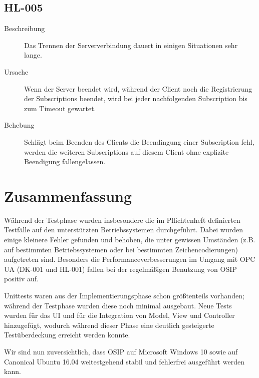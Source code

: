 \documentclass[parskip=full]{scrartcl}
\begin{document}
\subsection{HL-005}
\begin{description}
	\item[Beschreibung] Das Trennen der Serververbindung dauert in einigen Situationen sehr lange.
	\item[Ursache] Wenn der Server beendet wird, während der Client noch die Registrierung der Subscriptions beendet, wird bei jeder nachfolgenden Subscription bis zum Timeout gewartet.
	\item[Behebung] Schlägt beim Beenden des Clients die Beendingung einer Subscription fehl, werden die weiteren Subscriptions auf diesem Client ohne explizite Beendigung fallengelassen.
\end{description}

\section{Zusammenfassung}
Während der Testphase wurden insbesondere die im Pflichtenheft definierten Testfälle auf den unterstützten Betriebssystemen durchgeführt.
Dabei wurden einige kleinere Fehler gefunden und behoben, die unter gewissen Umständen (z.B. auf bestimmten Betriebssystemen oder bei bestimmten Zeichencodierungen)
aufgetreten sind. Besonders die Performanceverbesserungen im Umgang mit OPC UA (DK-001 und HL-001) fallen bei der regelmäßigen Benutzung von OSIP positiv auf.

Unittests waren aus der Implementierungsphase schon größtenteils vorhanden; während der Testphase wurden diese noch minimal ausgebaut. Neue Tests wurden für das UI
und für die Integration von Model, View und Controller hinzugefügt, wodurch während dieser Phase eine deutlich gesteigerte Testüberdeckung erreicht werden konnte.

Wir sind nun zuversichtlich, dass OSIP auf Microsoft Windows 10 sowie auf Canonical Ubuntu 16.04 weitestgehend stabil und fehlerfrei ausgeführt werden kann.

\pagebreak
{}
{}
\listoffigures
\end{document}
